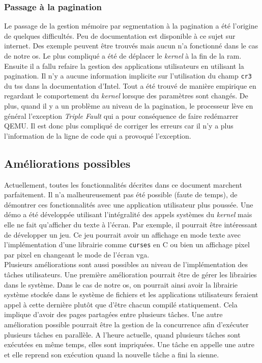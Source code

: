 \documentclass[a4paper, 12pt]{article}
\begin{document}
\subsubsection{Passage à la pagination}
Le passage de la gestion mémoire par segmentation à la pagination a été l'origine
de quelques difficultés. Peu de documentation est disponible à ce sujet sur internet.
Des exemple peuvent être trouvés mais aucun n'a fonctionné dans le cas de notre
\acrshort{os}. Le plus compliqué a été de déplacer le \textit{kernel} à la fin
de la \acrshort{ram}. Ensuite il a fallu refaire la gestion des applications
utilisateurs en utilisant la pagination. Il n'y a aucune information implicite
sur l'utilisation du champ \texttt{cr3} du \acrshort{tss} dans la documentation
d'Intel. Tout a été trouvé de manière empirique en regardant le comportement
du \textit{kernel} lorsque des paramètres sont changés. De plus, quand il y a
un problème au niveau de la pagination, le processeur lève en général l'exception
\textit{Triple Fault} qui a pour conséquence de faire redémarrer QEMU. Il est
donc plus compliqué de corriger les erreurs car il n'y a plus l'information de
la ligne de code qui a provoqué l'exception.


\newpage
\subsection{Améliorations possibles}
Actuellement, toutes les fonctionnalités décrites dans ce document marchent
parfaitement. Il n'a malheureusement pas été possible (faute de temps), de démontrer
ces fonctionnalités avec une application utilisateur plus poussée. Une démo a
été développée utilisant l'intégralité des appels systèmes du \textit{kernel}
mais elle ne fait qu'afficher du texte à l'écran. Par exemple, il pourrait être
intéressant de développer un jeu. Ce jeu pourrait avoir un affichage en mode texte
avec l'implémentation d'une librairie comme \texttt{curses} en C ou bien
un affichage pixel par pixel en changeant le mode de l'écran \acrshort{vga}. \\

Plusieurs améliorations sont aussi possibles au niveau de l'implémentation des
tâches utilisateurs. Une première amélioration pourrait être de gérer les
librairies dans le système. Dans le cas de notre \acrshort{os}, on pourrait
ainsi avoir la librairie système stockée dans le système de fichiers et les
applications utilisateurs feraient appel à cette dernière plutôt que d'être
chacun compilé statiquement. Cela implique d'avoir des pages partagées entre plusieurs
tâches. Une autre amélioration possible pourrait être la gestion de la concurrence
afin d'exécuter plusieurs tâches en parallèle. A l'heure actuelle, quand plusieurs
tâches sont exécutées en même temps, elles sont impriquées. Une tâche en appelle
une autre et elle reprend son exécution quand la nouvelle tâche a fini la sienne. \\
\end{document}
